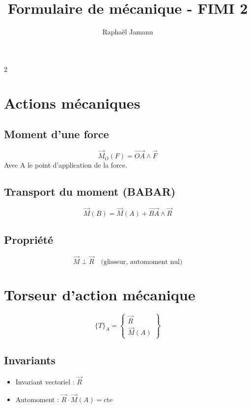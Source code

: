\documentclass[10pt,a4paper]{article}
\author{Raphaël Jamann}
\title{Formulaire de mécanique - FIMI 2}
\date{}
\renewcommand{\vec}{\overrightarrow}
\begin{document}
    \maketitle


    \begin{multicols}{2}

    \section{Actions mécaniques}

        \subsection*{Moment d'une force}
        \[
        \vec M_O(F) = \vec{OA} \wedge \vec F
        \]
        Avec A le point d'application de la force.

        \subsection*{Transport du moment (BABAR)}
        \[
        \vec M(B) = \vec M(A) + \vec{BA} \wedge \vec R
        \]
        
        \subsection*{Propriété}
        \[
        \vec M \perp \vec R \quad \text{(glisseur, automoment nul)}
        \]

    \section{Torseur d'action mécanique}

        \[
        \{T\}_A =
        \begin{Bmatrix}
        \vec R \\
        \vec M(A)
        \end{Bmatrix}
        \]

        \subsection*{Invariants}
        \begin{itemize}
            \item Invariant vectoriel : $\vec R$
            \item Automoment : $\vec R \cdot \vec M(A) = \text{cte}$
        \end{itemize}


\end{multicols}
\end{document}
